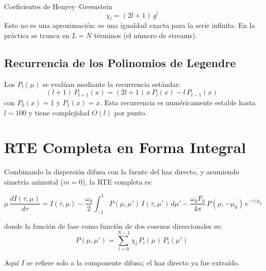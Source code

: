 \documentclass[a4paper,11pt]{article}
\begin{document}
\begin{keyresult}{Coeficientes de Henyey--Greenstein}
\begin{equation}
    \boxed{\chi_l = (2l+1)\,g^l}
\end{equation}
Esto no es una aproximaci\'on: es una igualdad exacta para la serie infinita.
En la pr\'actica se trunca en $L = N$ t\'erminos (el n\'umero de streams).
\end{keyresult}

\subsection{Recurrencia de los Polinomios de Legendre}

Los $P_l(\mu)$ se eval\'uan mediante la recurrencia est\'andar:
\begin{equation}
    (l+1)\,P_{l+1}(x) = (2l+1)\,x\,P_l(x) - l\,P_{l-1}(x)
\end{equation}
con $P_0(x) = 1$ y $P_1(x) = x$.  Esta recurrencia es num\'ericamente estable
hasta $l \sim 100$ y tiene complejidad $O(l)$ por punto.


\section{RTE Completa en Forma Integral}

Combinando la dispersi\'on difusa con la fuente del haz directo, y asumiendo
simetr\'ia azimutal ($m=0$), la RTE completa es:

\begin{equation}\label{eq:rte_full}
    \boxed{\mu\,\frac{dI(\tau,\mu)}{d\tau} = I(\tau,\mu)
    - \frac{\omega_0}{2}\int_{-1}^{1}P(\mu,\mu')\,I(\tau,\mu')\,d\mu'
    - \frac{\omega_0 F_0}{4\pi}\,P(\mu,-\mu_0)\,e^{-\tau/\mu_0}}
\end{equation}

donde la funci\'on de fase como funci\'on de dos cosenos direccionales es:
\begin{equation}\label{eq:phase_matrix_def}
    P(\mu,\mu') = \sum_{l=0}^{N-1}\chi_l\,P_l(\mu)\,P_l(\mu')
\end{equation}

Aqu\'i $I$ se refiere solo a la componente difusa; el haz directo ya fue
extra\'ido.

\end{document}
